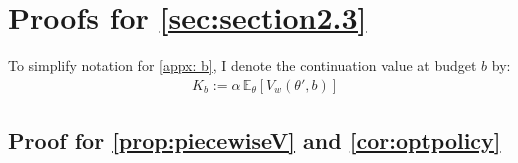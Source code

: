 \section{Proofs for \autoref{sec:section2.3}}\label{appx: b} 
To simplify notation for \autoref{appx: b}, I denote the continuation value at budget $b$ by: 
\begin{equation*}
    \begin{aligned}
        &K_{b}:=\alpha \,\mathbb{E}_{\theta}\left[V_w(\theta', b)\right] 
    \end{aligned} 
\end{equation*}

\subsection{Proof for \autoref{prop:piecewiseV} and \autoref{cor:optpolicy}} 
